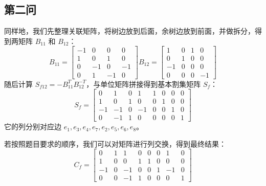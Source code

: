 \documentclass[utf8]{ctexart}
\theoremstyle{mystyle}
\begin{document}
\subsection*{第二问}
同样地，我们先整理关联矩阵，将树边放到后面，余树边放到前面，并做拆分，得到两矩阵 $B_{11}$ 和 $B_{12}$：
\[
B_{11} = \begin{bmatrix}-1 & 0 & 0 & 0 \\ 1 & 0 & 1 & 0 \\ 0 & -1 & 0 & -1 \\ 0 & 1 & -1 & 0\end{bmatrix}
B_{12} = \begin{bmatrix}1 & 0 & 1 & 0 \\ 0 & 1 & 0 & 0 \\ -1 & 0 & 0 & 0 \\ 0 & 0 & 0 & -1\end{bmatrix}
\]
随后计算 $S_{f12} = -B_{11}^{T}B_{12}^{-T}$，与单位矩阵拼接得到基本割集矩阵 $S_f$：
\[
S_f = \begin{bmatrix}0 & 1 & 0 & 1 & 1 & 0 & 0 & 0 \\ 1 & 0 & 1 & 0 & 0 & 1 & 0 & 0 \\ -1 & -1 & 0 & -1 & 0 & 0 & 1 & 0 \\ 0 & -1 & 1 & 0 & 0 & 0 & 0 & 1\end{bmatrix}
\]
它的列分别对应边 $e_1, e_3, e_4, e_7, e_2, e_5, e_6, e_8$。

若按照题目要求的顺序，我们可以对矩阵进行列交换，得到最终结果：
\[
C_f = \begin{bmatrix}0 & 1 & 1 & 0 & 0 & 0 & 1 & 0 \\ 1 & 0 & 0 & 1 & 1 & 0 & 0 & 0 \\ -1 & 0 & -1 & 0 & 0 & 1 & -1 & 0 \\ 0 & 0 & -1 & 1 & 0 & 0 & 0 & 1\end{bmatrix}
\]
\newpage
\end{document}
